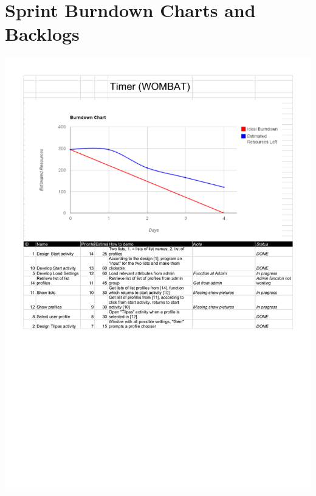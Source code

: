 \section{Sprint Burndown Charts and Backlogs}
\label{sec:burn_back}
	\begin{center}
		\includegraphics[width=\textwidth]{Development/burndown_charts/Sprint_1.pdf}

\end{center}
